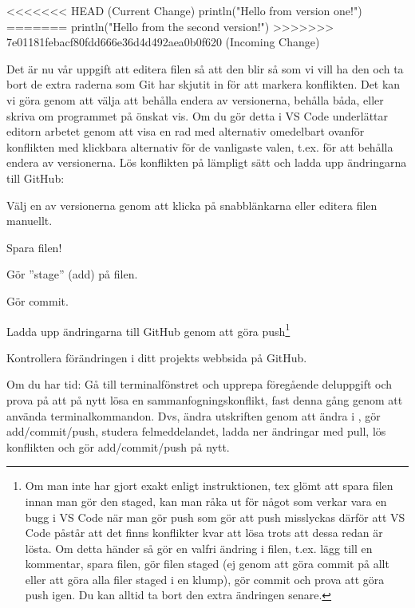 \begin{Datorarbete}
	\begin{Code}
		<<<<<<< HEAD (Current Change)
		println("Hello from version one!")
		=======
		println("Hello from the second version!")
		>>>>>>> 7e01181febacf80fdd666e36d4d492aea0b0f620 (Incoming Change)
	\end{Code}

	Det är nu vår uppgift att editera filen så att den blir så som vi vill ha den och ta bort de extra raderna som Git har skjutit in för att markera konflikten. Det kan vi göra genom att välja att behålla endera av versionerna, behålla båda, eller skriva om programmet på önskat vis. Om du gör detta i VS Code underlättar editorn arbetet genom att visa en rad med alternativ omedelbart ovanför konflikten med klickbara alternativ för de vanligaste valen, t.ex. för att behålla endera av versionerna. Lös konflikten på lämpligt sätt och ladda upp ändringarna till GitHub:

	\begin{Deluppgifter}
		\item Välj en av versionerna genom att klicka på snabblänkarna eller editera filen manuellt.
		\item Spara filen!
		\item Gör ''stage'' (add) på filen.
		\item Gör commit.
		\item Ladda upp ändringarna till GitHub genom att göra push\footnote{Om man inte har gjort exakt enligt instruktionen, tex glömt att spara filen innan man gör den staged, kan man råka ut för något som verkar vara en bugg i VS Code när man gör push som gör att push misslyckas därför att VS Code påstår att det finns konflikter kvar att lösa trots att dessa redan är lösta. Om detta händer så gör en valfri ändring i filen, t.ex. lägg till en kommentar, spara filen, gör filen staged (ej genom att göra commit på allt eller att göra alla filer staged i en klump), gör commit och prova att göra push igen. Du kan alltid ta bort den extra ändringen senare.}
		\item Kontrollera förändringen i ditt projekts webbsida på GitHub.
	\end{Deluppgifter}

	\item Om du har tid: Gå till terminalfönstret och upprepa föregående deluppgift och prova på att på nytt lösa en sammanfogningskonflikt, fast denna gång genom att använda terminalkommandon. Dvs, ändra utskriften genom att ändra  i , gör add/commit/push, studera felmeddelandet, ladda ner ändringar med pull, lös konflikten och gör add/commit/push på nytt.


\end{Datorarbete}


